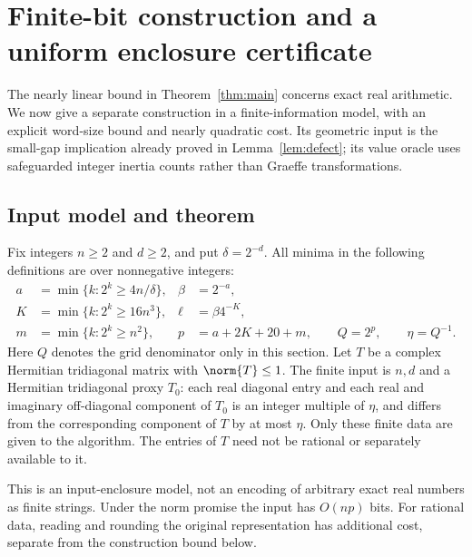 \section{Finite-bit construction and a uniform enclosure certificate}
\label{sec:finite-bit}

The nearly linear bound in Theorem~\ref{thm:main} concerns exact real
arithmetic. We now give a separate construction in a finite-information
model, with an explicit word-size bound and nearly quadratic cost.
Its geometric input is the small-gap implication already proved in
Lemma~\ref{lem:defect}; its value oracle uses safeguarded integer
inertia counts rather than Graeffe transformations.

\subsection{Input model and theorem}
\label{subsec:finite-model}

Fix integers $n\geq2$ and $d\geq2$, and put $\delta=2^{-d}$.
All minima in the following definitions are over nonnegative integers:
\begin{align}
 a&=\min\{k:2^k\geq4n/\delta\},
 &\beta&=2^{-a},\label{eq:bit-a}\\
 K&=\min\{k:2^k\geq16n^3\},
 &\ell&=\beta4^{-K},\label{eq:bit-K}\\
 m&=\min\{k:2^k\geq n^2\},
 &p&=a+2K+20+m,\qquad Q=2^p,\qquad\eta=Q^{-1}.
 \label{eq:bit-precision}
\end{align}
Here $Q$ denotes the grid denominator only in this section.
Let $T$ be a complex Hermitian tridiagonal matrix with $\norm{T}\leq1$.
The finite input is $n,d$ and a Hermitian tridiagonal proxy $T_0$:
each real diagonal entry and each real and imaginary off-diagonal
component of $T_0$ is an integer multiple of $\eta$, and differs from
the corresponding component of $T$ by at most $\eta$.
Only these finite data are given to the algorithm. The entries of
$T$ need not be rational or separately available to it.

This is an input-enclosure model, not an encoding of arbitrary exact
real numbers as finite strings. Under the norm promise the input has
$O(np)$ bits. For rational data, reading and rounding the original
representation has additional cost, separate from the construction
bound below.


